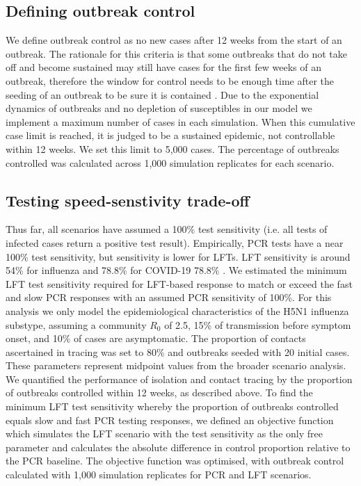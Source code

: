 \documentclass{article}
\begin{document}
\subsection*{Defining outbreak control}

We define outbreak control as no new cases after 12 weeks from the start of an outbreak. The rationale for this criteria is that some outbreaks that do not take off and become sustained may still have cases for the first few weeks of an outbreak, therefore the window for control needs to be enough time after the seeding of an outbreak to be sure it is contained \citep{hellewellFeasibilityControllingCOVID192020}. Due to the exponential dynamics of outbreaks and no depletion of susceptibles in our model we implement a maximum number of cases in each simulation. When this cumulative case limit is reached, it is judged to be a sustained epidemic, not controllable within 12 weeks. We set this limit to 5,000 cases. The percentage of outbreaks controlled was calculated across 1,000 simulation replicates for each scenario.

\subsection*{Testing speed-senstivity trade-off}

Thus far, all scenarios have assumed a 100\% test sensitivity (i.e. all tests of infected cases return a positive test result). Empirically, PCR tests have a near 100\% test sensitivity, but sensitivity is lower for LFTs. LFT sensitivity is around 54\% for influenza and 78.8\% for COVID-19 78.8\% \citep{merckxDiagnosticAccuracyNovel2017, petoCOVID19RapidAntigen2021}. We estimated the minimum LFT test sensitivity required for LFT-based response to match or exceed the fast and slow PCR responses with an assumed PCR sensitivity of 100\%. For this analysis we only model the epidemiological characteristics of the H5N1 influenza substype, assuming a community $R_0$ of 2.5, 15\% of transmission before symptom onset, and 10\% of cases are asymptomatic. The proportion of contacts ascertained in tracing was set to 80\% and outbreaks seeded with 20 initial cases. These parameters represent midpoint values from the broader scenario analysis. \\

We quantified the performance of isolation and contact tracing by the proportion of outbreaks controlled within 12 weeks, as described above. To find the minimum LFT test sensitivity whereby the proportion of outbreaks controlled equals slow and fast PCR testing responses, we defined an objective function which simulates the LFT scenario with the test sensitivity as the only free parameter and calculates the absolute difference in control proportion relative to the PCR baseline. The objective function was optimised, with outbreak control calculated with 1,000 simulation replicates for PCR and LFT scenarios.
\end{document}
